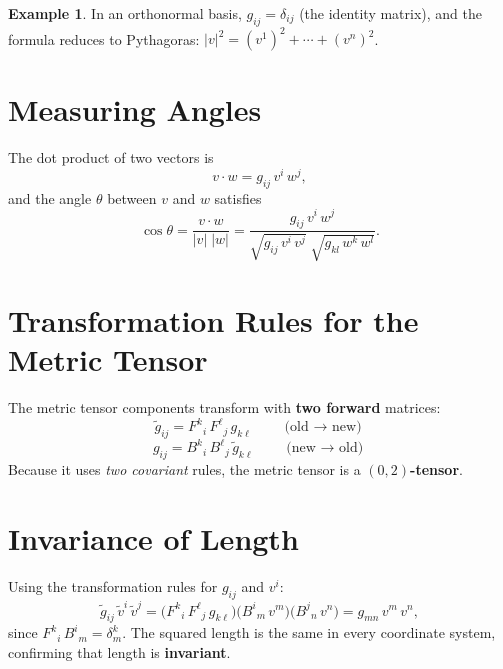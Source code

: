 \documentclass[12pt, a4paper]{report}
\theoremstyle{definition}
\newtheorem{example}{Example}[chapter]
\theoremstyle{plain}
\theoremstyle{remark}
\begin{document}
\begin{example}
In an orthonormal basis, $g_{ij} = \delta_{ij}$ (the identity matrix), and the
formula reduces to Pythagoras: $|v|^{2} = (v^{1})^{2} + \cdots + (v^{n})^{2}$.
\end{example}

\section{Measuring Angles}

The dot product of two vectors is
\[
    v \cdot w = g_{ij}\, v^{i}\, w^{j},
\]
and the angle $\theta$ between $v$ and $w$ satisfies
\begin{equation}\label{eq:angle}
    \boxed{\cos\theta = \frac{v \cdot w}{|v|\;|w|}
    = \frac{g_{ij}\, v^{i}\, w^{j}}
           {\sqrt{g_{ij}\, v^{i}\, v^{j}}\;\sqrt{g_{kl}\, w^{k}\, w^{l}}}.}
\end{equation}

\section{Transformation Rules for the Metric Tensor}

The metric tensor components transform with \textbf{two forward} matrices:
\begin{equation}\label{eq:metric-fwd}
    \boxed{\tilde{g}_{ij} = F^{k}{}_{i}\, F^{\ell}{}_{j}\, g_{k\ell}}
    \qquad\text{(old $\to$ new)}
\end{equation}
\begin{equation}\label{eq:metric-bwd}
    g_{ij} = B^{k}{}_{i}\, B^{\ell}{}_{j}\, \tilde{g}_{k\ell}
    \qquad\text{(new $\to$ old)}
\end{equation}
Because it uses \emph{two covariant} rules, the metric tensor is a
\textbf{$(0,2)$-tensor}.

\section{Invariance of Length}

Using the transformation rules for $g_{ij}$ and $v^{i}$:
\[
    \tilde{g}_{ij}\,\tilde{v}^{i}\,\tilde{v}^{j}
    = \bigl(F^{k}{}_{i}\,F^{\ell}{}_{j}\,g_{k\ell}\bigr)
      \bigl(B^{i}{}_{m}\,v^{m}\bigr)
      \bigl(B^{j}{}_{n}\,v^{n}\bigr)
    = g_{mn}\,v^{m}\,v^{n},
\]
since $F^{k}{}_{i}\,B^{i}{}_{m} = \delta^{k}_{m}$.  The squared length is the
same in every coordinate system, confirming that length is \textbf{invariant}.
\end{document}
